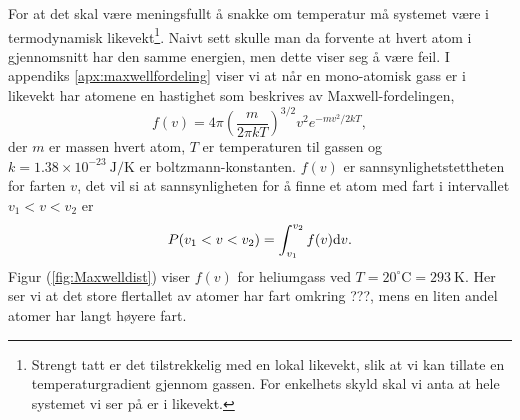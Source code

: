 For at det skal være meningsfullt å snakke om temperatur må systemet være i termodynamisk likevekt\footnote{Strengt tatt er det tilstrekkelig med en lokal likevekt, slik at vi kan tillate en temperaturgradient gjennom gassen. For enkelhets skyld skal vi anta at hele systemet vi ser på er i likevekt.}. Naivt sett skulle man da forvente at hvert atom i gjennomsnitt har den samme energien, men dette viser seg å være feil. I appendiks \ref{apx:maxwellfordeling} viser vi at når en mono-atomisk gass er i likevekt har atomene en hastighet som beskrives av Maxwell-fordelingen,
\begin{equation}
\label{eq:kinetiskgassteori:fv}	
	f(v) = 4\pi\left( \frac{m}{2\pi kT} \right)^{3/2} v^2e^{-mv^2/2kT},
\end{equation}
der $m$ er massen hvert atom, $T$ er temperaturen til gassen og $k = 1.38\times10^{-23}~\mathrm{J/K}$ er boltzmann-konstanten. $f(v)$ er sannsynlighetstettheten for farten $v$, det vil si at sannsynligheten for å finne et atom med fart i intervallet $v_1<v<v_2$ er
\begin{displaymath}
	P(v_1 < v < v_2) = \int_{v_1}^{v_2} f(v) \text{d} v.
\end{displaymath}
Figur (\ref{fig:Maxwelldist}) viser $f(v)$ for heliumgass ved $T=20^\circ\mathrm{C} = 293~\mathrm{K}$. Her ser vi at det store flertallet av atomer har fart omkring ???, mens en liten andel atomer har langt høyere fart. 

